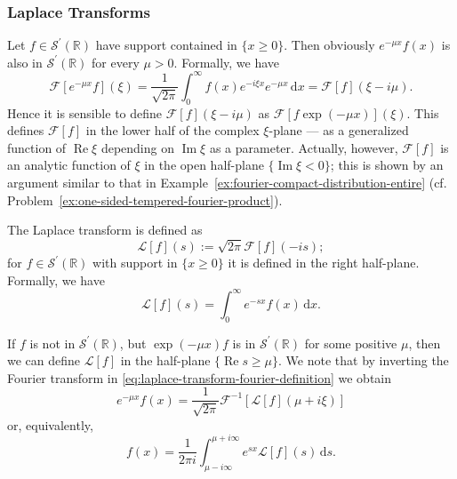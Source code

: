 \subsubsection{Laplace Transforms}\label{subsec:laplace-transforms}

Let $f\in\mathcal{S}^{\prime}(\mathbb{R})$ have support contained in $\{x\geq0\}$. Then obviously $e^{-\mu x}f(x)$ is also in $\mathcal{S}^{\prime}(\mathbb{R})$ for every $\mu>0$. Formally, we have
\begin{equation}\label{eq:laplace-fourier-complex-frequency-shift}
\mathcal{F}[e^{-\mu x}f](\xi)=\dfrac1{\sqrt{2\pi}}\int_0^\infty f(x)e^{-i\xi x}e^{-\mu x}\,\mathrm{d}x=\mathcal{F}[f](\xi-i\mu).
\end{equation}
Hence it is sensible to define $\mathcal{F}[f](\xi-i\mu)$ as $\mathcal{F}[f\exp(-\mu x)](\xi)$. This defines $\mathcal{F}[f]$ in the lower half of the complex $\xi$-plane --- as a generalized function of $\operatorname{Re}\xi$ depending on $\operatorname{Im}\xi$ as a parameter. Actually, however, $\mathcal{F}[f]$ is an analytic function of $\xi$ in the open half-plane $\{\operatorname{Im}\xi<0\}$; this is shown by an argument similar to that in Example~\ref{ex:fourier-compact-distribution-entire} (cf. Problem~\ref{ex:one-sided-tempered-fourier-product}).

The Laplace transform is defined as
\begin{equation}\label{eq:laplace-transform-fourier-definition}
\mathcal{L}[f](s):=\sqrt{2\pi}\mathcal{F}[f](-is);
\end{equation}
for $f\in\mathcal{S}^{\prime}(\mathbb{R})$ with support in $\{x\geq0\}$ it is defined in the right half-plane. Formally, we have
\begin{equation}\label{eq:laplace-transform-formal-integral}
\mathcal{L}[f](s)=\int_0^\infty e^{-sx}f(x)\,\mathrm{d}x.
\end{equation}


If $f$ is not in $\mathcal{S}^{\prime}(\mathbb{R})$, but $\exp(-\mu x)f$ is in $\mathcal{S}^{\prime}(\mathbb{R})$ for some positive $\mu$, then we can define $\mathcal{L}[f]$ in the half-plane $\{\operatorname{Re}s\geq\mu\}$. We note that by inverting the Fourier transform in \eqref{eq:laplace-transform-fourier-definition} we obtain
\begin{equation}\label{eq:laplace-inversion-weighted-fourier-formula}
e^{-\mu x}f(x)=\dfrac1{\sqrt{2\pi}}\mathcal{F}^{-1}[\mathcal{L}[f](\mu+i\xi)]
\end{equation}
or, equivalently,
\begin{equation}\label{eq:inverse-laplace-contour-formula}
f(x)=\dfrac1{2\pi i}\int_{\mu-i\infty}^{\mu+i\infty}e^{sx}\mathcal{L}[f](s)\,\mathrm{d}s.
\end{equation}



